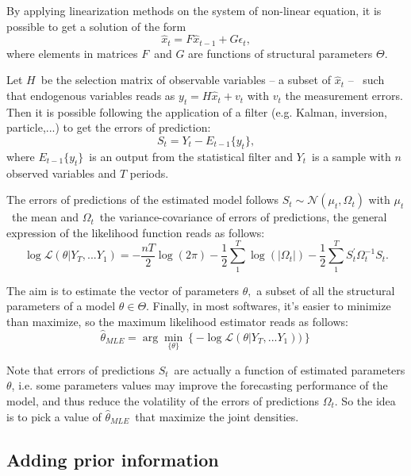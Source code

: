 \documentclass[a4paper,12pt]{article}%
\begin{document}
By applying linearization methods on the system of non-linear equation, it is
possible to get a solution of the form
\begin{equation}
\hat{x}_{t}=F\hat{x}_{t-1}+G\epsilon_{t}, \label{eq: non linear DR}%
\end{equation}
where elements in matrices $F$\ and $G$ are functions of structural parameters
$\Theta$.

Let $H$\ be the selection matrix of observable variables -- a subset of
$\hat{x}_{t}$ -- \ such that endogenous variables reads as $y_{t}=H\hat{x}%
_{t}+v_{t}$ with $v_{t}$ the measurement errors. Then it is possible following
the application of a filter (e.g. Kalman, inversion, particle,...) to get the
errors of prediction:%
\[
S_{t}=Y_{t}-E_{t-1}\{y_{t}\},
\]
where $E_{t-1}\{y_{t}\}$\ is an output from the statistical filter and $Y_{t}%
$\ is a sample with $n$ observed variables and $T$ periods.\ 

The errors of predictions of the estimated model follows $S_{t}\sim
\mathcal{N}(\mu_{t},\Omega_{t})$ with $\mu_{t}$\ the mean and $\Omega_{t}%
$\ the variance-covariance of errors of predictions, the general expression of
the likelihood function reads as follows:%
\begin{equation}
\log\mathcal{L}\left(  \theta|Y_{T},...Y_{1}\right)  =-\frac{nT}{2}\log
(2\pi)-\frac{1}{2}\sum_{1}^{T}\log\left(  |\Omega_{t}|\right)  -\frac{1}%
{2}\sum_{1}^{T}S_{t}^{\prime}\Omega_{t}^{-1}S_{t}.
\end{equation}


The aim is to estimate the vector of parameters $\theta,$ a subset of all the
structural parameters of a model $\theta\in\Theta$. Finally, in most
softwares, it's easier to minimize than maximize, so the maximum likelihood
estimator reads as follows:%
\begin{equation}
\hat{\theta}_{MLE}=\arg\min_{\{\theta\}}\left\{  -\log\mathcal{L}\left(
\theta|Y_{T},...Y_{1}\right)  )\right\}
\end{equation}


Note that errors of predictions $S_{t}$\ are actually a function of estimated
parameters $\theta$, i.e. some parameters values may improve the forecasting
performance of the model, and thus reduce the volatility of the errors of
predictions $\Omega_{t}$. So the idea is to pick a value of $\hat{\theta
}_{MLE}$\ that maximize the joint densities.

\subsection{Adding prior information}
\end{document}
